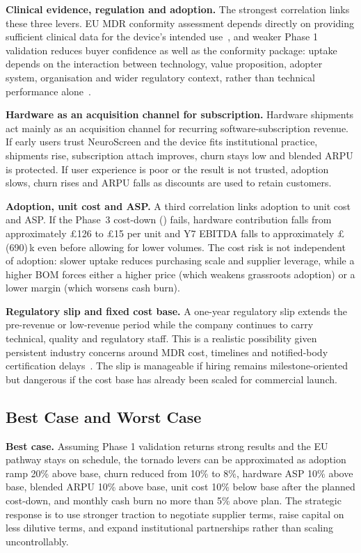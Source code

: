 \textbf{Clinical evidence, regulation and adoption.} The strongest correlation links these three levers. EU MDR conformity assessment depends directly on providing sufficient clinical data for the device's intended use~\cite{mdr_article61}, and weaker Phase 1 validation reduces buyer confidence as well as the conformity package: uptake depends on the interaction between technology, value proposition, adopter system, organisation and wider regulatory context, rather than technical performance alone~\cite{greenhalgh2017nasss}.

\textbf{Hardware as an acquisition channel for subscription.} Hardware shipments act mainly as an acquisition channel for recurring software-subscription revenue. If early users trust NeuroScreen and the device fits institutional practice, shipments rise, subscription attach improves, churn stays low and blended ARPU is protected. If user experience is poor or the result is not trusted, adoption slows, churn rises and ARPU falls as discounts are used to retain customers.

\textbf{Adoption, unit cost and ASP.} A third correlation links adoption to unit cost and ASP. If the Phase~3 cost-down () fails, hardware contribution falls from approximately \pounds126 to \pounds15 per unit and Y7 EBITDA falls to approximately \pounds(690)\,k even before allowing for lower volumes. The cost risk is not independent of adoption: slower uptake reduces purchasing scale and supplier leverage, while a higher BOM forces either a higher price (which weakens grassroots adoption) or a lower margin (which worsens cash burn).

\textbf{Regulatory slip and fixed cost base.} A one-year regulatory slip extends the pre-revenue or low-revenue period while the company continues to carry technical, quality and regulatory staff. This is a realistic possibility given persistent industry concerns around MDR cost, timelines and notified-body certification delays~\cite{medtech_europe_2024}. The slip is manageable if hiring remains milestone-oriented but dangerous if the cost base has already been scaled for commercial launch.

\subsection{Best Case and Worst Case}

\textbf{Best case.} Assuming Phase 1 validation returns strong results and the EU pathway stays on schedule, the tornado levers can be approximated as adoption ramp 20\% above base, churn reduced from 10\% to 8\%, hardware ASP 10\% above base, blended ARPU 10\% above base, unit cost 10\% below base after the planned cost-down, and monthly cash burn no more than 5\% above plan. The strategic response is to use stronger traction to negotiate supplier terms, raise capital on less dilutive terms, and expand institutional partnerships rather than scaling uncontrollably.

